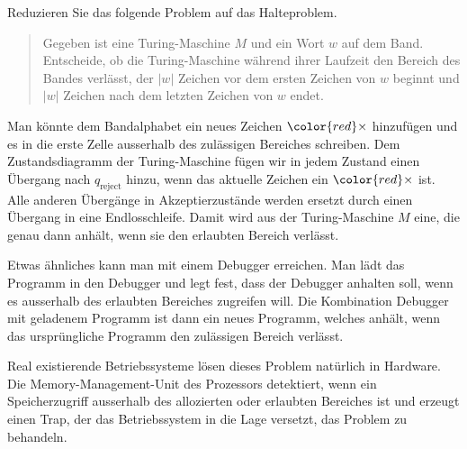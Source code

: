 Reduzieren Sie das folgende Problem auf das Halteproblem.

\begin{quote}
Gegeben ist eine Turing-Maschine $M$ und ein Wort $w$ auf dem Band.
Entscheide, ob die Turing-Maschine während ihrer Laufzeit den 
Bereich des Bandes verlässt, der $|w|$ Zeichen vor dem ersten
Zeichen von $w$ beginnt und $|w|$ Zeichen nach dem letzten Zeichen
von $w$ endet.
\end{quote}

\begin{center}
\end{center}


\begin{loesung}
Man könnte dem Bandalphabet ein neues Zeichen $\color{red}\times$
hinzufügen und es in die erste Zelle ausserhalb des zulässigen 
Bereiches schreiben.
Dem Zustandsdiagramm der Turing-Maschine fügen wir in jedem Zustand
einen Übergang nach $q_{\text{reject}}$ hinzu, wenn das aktuelle Zeichen
ein ${\color{red}\times}$ ist.
Alle anderen Übergänge in Akzeptierzustände werden ersetzt durch einen
Übergang in eine Endlosschleife.
Damit wird aus der Turing-Maschine $M$ eine, die genau dann anhält,
wenn sie den erlaubten Bereich verlässt.

Etwas ähnliches kann man mit einem Debugger erreichen.
Man lädt das Programm in den Debugger und legt fest, dass
der Debugger anhalten soll, wenn es ausserhalb des erlaubten Bereiches
zugreifen will.
Die Kombination Debugger mit geladenem Programm ist dann ein neues
Programm, welches anhält, wenn das ursprüngliche Programm den zulässigen
Bereich verlässt.

Real existierende Betriebssysteme lösen dieses Problem natürlich in 
Hardware.
Die Memory-Management-Unit des Prozessors detektiert, wenn ein
Speicherzugriff ausserhalb des allozierten oder erlaubten Bereiches ist 
und erzeugt einen Trap, der das Betriebssystem in die Lage versetzt,
das Problem zu behandeln.
\end{loesung}
